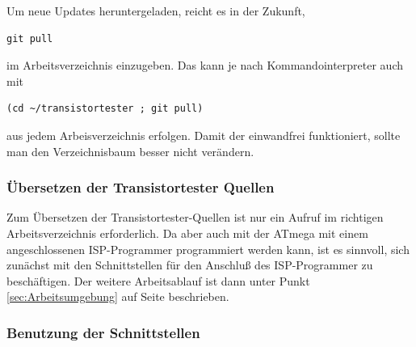 Um neue Updates heruntergeladen, reicht es in der Zukunft, 
\begin{large} \vspace{-0.4em} \begin{verbatim}
git pull
\end{verbatim} \end{large}
im Arbeitsverzeichnis  einzugeben.
Das kann je nach Kommandointerpreter auch mit
\begin{large} \vspace{-0.4em} \begin{verbatim}
(cd ~/transistortester ; git pull)
\end{verbatim} \end{large}
aus jedem Arbeisverzeichnis erfolgen.
Damit der  einwandfrei funktioniert, sollte man den
Verzeichnisbaum besser nicht verändern.

\subsubsection{Übersetzen der Transistortester Quellen}

Zum Übersetzen der Transistortester-Quellen ist nur ein  Aufruf
im richtigen Arbeitsverzeichnis erforderlich.
Da aber auch mit  der ATmega mit einem angeschlossenen
ISP-Programmer programmiert werden kann, ist es sinnvoll,
sich zunächst mit den Schnittstellen für den Anschluß des ISP-Programmer
zu beschäftigen.
Der weitere Arbeitsablauf ist dann unter Punkt \ref{sec:Arbeitsumgebung} auf
Seite \pageref{sec:Arbeitsumgebung} beschrieben.

\subsubsection{Benutzung der Schnittstellen}
\label{sec:Schnittstellen}

